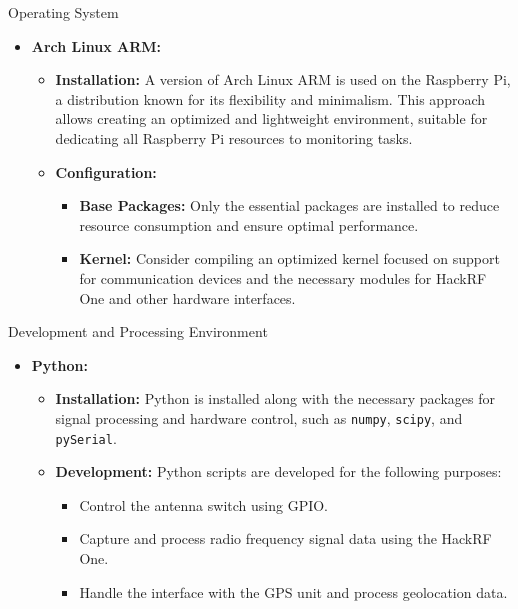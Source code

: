 \begin{list}{*}{}
	
	\item {Operating System}
	\begin{itemize}
		\item \textbf{Arch Linux ARM:}
		\begin{itemize}
			\item \textbf{Installation:} A version of Arch Linux ARM is used on the Raspberry Pi, a distribution known for its flexibility and minimalism. This approach allows creating an optimized and lightweight environment, suitable for dedicating all Raspberry Pi resources to monitoring tasks.
			\item \textbf{Configuration:}
			\begin{itemize}
				\item \textbf{Base Packages:} Only the essential packages are installed to reduce resource consumption and ensure optimal performance.
				\item \textbf{Kernel:} Consider compiling an optimized kernel focused on support for communication devices and the necessary modules for HackRF One and other hardware interfaces.
			\end{itemize}
		\end{itemize}
	\end{itemize}
	
	\item {Development and Processing Environment}
	\begin{itemize}
		\item \textbf{Python:}
		\begin{itemize}
			\item \textbf{Installation:} Python is installed along with the necessary packages for signal processing and hardware control, such as \texttt{numpy}, \texttt{scipy}, and \texttt{pySerial}.
			\item \textbf{Development:} Python scripts are developed for the following purposes:
			\begin{itemize}
				\item Control the antenna switch using GPIO.
				\item Capture and process radio frequency signal data using the HackRF One.
				\item Handle the interface with the GPS unit and process geolocation data.
			\end{itemize}
		\end{itemize}
	\end{itemize}
	

\end{list}
